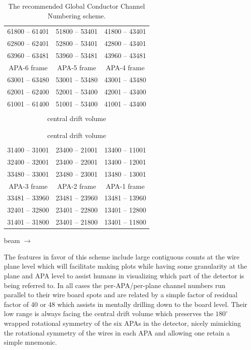 \documentclass[pdftex,12pt,letter]{article}
\begin{document}
\begin{table}[htp]
  
  \centering
  \begin{tabular}[h]{|c|c|c|}
    \hline
    61800 -- 61401 & 51800 -- 53401 & 41800 -- 43401\\
    62800 -- 62401 & 52800 -- 53401 & 42800 -- 43401\\
    63960 -- 63481 & 53960 -- 53481 & 43960 -- 43481\\
    \hline
    APA-6 frame & APA-5 frame & APA-4 frame \\
    \hline
    63001 -- 63480 & 53001 -- 53480 & 43001 -- 43480\\
    62001 -- 62400 & 52001 -- 53400 & 42001 -- 43400\\
    61001 -- 61400 & 51001 -- 53400 & 41001 -- 43400\\
    \hline
    \multicolumn{3}{|c|}{}\\
    \multicolumn{3}{|c|}{central drift volume}\\
    \multicolumn{3}{|c|}{}\\
    \hline
    \hline
    \hline
    \multicolumn{3}{|c|}{}\\
    \multicolumn{3}{|c|}{central drift volume}\\
    \multicolumn{3}{|c|}{}\\
    \hline
    31400 -- 31001 & 23400 -- 21001 & 13400 -- 11001\\
    32400 -- 32001 & 23400 -- 22001 & 13400 -- 12001\\
    33480 -- 33001 & 23480 -- 23001 & 13480 -- 13001\\
    \hline
    APA-3 frame & APA-2 frame & APA-1 frame \\
    \hline
    33481 -- 33960 & 23481 -- 23960 & 13481 -- 13960\\
    32401 -- 32800 & 23401 -- 22800 & 13401 -- 12800\\
    31401 -- 31800 & 23401 -- 21800 & 13401 -- 11800\\
    \hline
  \end{tabular}

  beam $\longrightarrow$

  \caption{The recommended Global Conductor Channel Numbering scheme.}
  \label{tab:gccn}

\end{table}

The features in favor of this scheme include large contiguous counts
at the wire plane level which will facilitate making plots while
having some granularity at the plane and APA level to assist humans in
visualizing which part of the detector is being referred to.  In all
cases the per-APA/per-plane channel numbers run parallel to their wire
board spots and are related by a simple factor of residual factor of
40 or 48 which assists in mentally drilling down to the board level.
Their low range is always facing the central drift volume which
preserves the $180^\circ$ wrapped rotational symmetry of the six APAs
in the detector, nicely mimicking the rotational symmetry of the wires
in each APA and allowing one retain a simple mnemonic.
\end{document}
